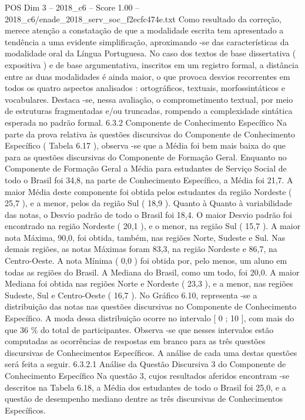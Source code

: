 \begin{textsample}{POS Dim 3 – 2018\_c6 – Score 1.00 – 2018\_c6/enade\_2018\_serv\_soc\_f2ecfc474e.txt}
Como resultado da correção, merece atenção a constatação de que a modalidade escrita tem apresentado a tendência a uma evidente simplificação, aproximando -se das características da modalidade oral da Língua Portuguesa.
No caso dos textos de base dissertativa ( expositiva ) e de base argumentativa, inscritos em um registro formal, a distância entre as duas modalidades é ainda maior, o que provoca desvios recorrentes em todos os quatro aspectos analisados : ortográficos, textuais, morfossintáticos e vocabulares.
Destaca -se, nessa avaliação, o comprometimento textual, por meio de estruturas fragmentadas e/ou truncadas, rompendo a complexidade sintática esperada no padrão formal. 6.3.2 Componente de Conhecimento Específico Na parte da prova relativa às questões discursivas do Componente de Conhecimento Específico ( Tabela 6.17 ), observa -se que a Média foi bem mais baixa do que para as questões discursivas do Componente de Formação Geral.
Enquanto no Componente de Formação Geral a Média para estudantes de Serviço Social de todo o Brasil foi 34,8, na parte de Conhecimento Específico, a Média foi 21,7.
A maior Média deste componente foi obtida pelos estudantes da região Nordeste ( 25,7 ), e a menor, pelos da região Sul ( 18,9 ).
Quanto à Quanto à variabilidade das notas, o Desvio padrão de todo o Brasil foi 18,4.
O maior Desvio padrão foi encontrado na região Nordeste ( 20,1 ), e o menor, na região Sul ( 15,7 ).
A maior nota Máxima, 90,0, foi obtida, também, nas regiões Norte, Sudeste e Sul.
Nas demais regiões, as notas Máximas foram 83,3, na região Nordeste e 86,7, na Centro-Oeste.
A nota Mínima ( 0,0 ) foi obtida por, pelo menos, um aluno em todas as regiões do Brasil.
A Mediana do Brasil, como um todo, foi 20,0.
A maior Mediana foi obtida nas regiões Norte e Nordeste ( 23,3 ), e a menor, nas regiões Sudeste, Sul e Centro-Oeste ( 16,7 ).
No Gráfico 6.10, representa -se a distribuição das notas nas questões discursivas no Componente de Conhecimento Específico.
A moda dessa distribuição ocorre no intervalo [ 0 ; 10 ], com mais do que 36 \% do total de participantes.
Observa -se que nesses intervalos estão computadas as ocorrências de respostas em branco para as três questões discursivas de Conhecimentos Específicos.
A análise de cada uma destas questões será feita a seguir. 6.3.2.1 Análise da Questão Discursiva 3 do Componente de Conhecimento Específico Na questão 3, cujos resultados aferidos encontram -se descritos na Tabela 6.18, a Média dos estudantes de todo o Brasil foi 25,0, e a questão de desempenho mediano dentre as três discursivas de Conhecimentos Específicos.

\end{textsample}
